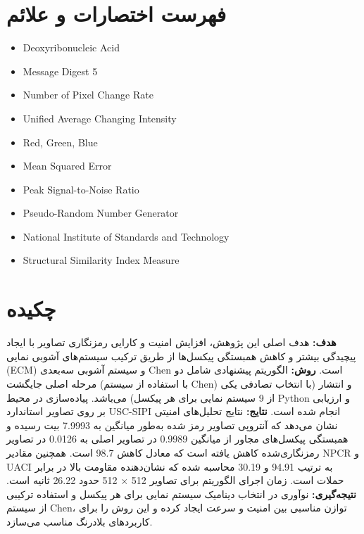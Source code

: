 \documentclass[a4paper,12pt]{report}
\renewcommand{\%}{\lr{\oldpercent}}
\providecommand{\lr}[1]{#1}
\begin{document}
\chapter*{فهرست اختصارات و علائم}
\begin{latin}
\begin{itemize}
    \item[DNA] Deoxyribonucleic Acid
    \item[MD5] Message Digest 5
    \item[NPCR] Number of Pixel Change Rate
    \item[UACI] Unified Average Changing Intensity
    \item[RGB] Red, Green, Blue
    \item[MSE] Mean Squared Error
    \item[PSNR] Peak Signal-to-Noise Ratio
    \item[PRNG] Pseudo-Random Number Generator
    \item[NIST] National Institute of Standards and Technology
    \item[SSIM] Structural Similarity Index Measure
\end{itemize}
\end{latin}
\newpage
\clearpage

\setcounter{page}{1}

\chapter*{چکیده}

\textbf{هدف:} هدف اصلی این پژوهش، افزایش امنیت و کارایی رمزنگاری تصاویر با ایجاد پیچیدگی بیشتر و کاهش همبستگی پیکسل‌ها از طریق ترکیب سیستم‌های آشوبی نمایی (\lr{ECM}) و سیستم آشوبی سه‌بعدی \lr{Chen} است. 
\textbf{روش:} الگوریتم پیشنهادی شامل دو مرحله اصلی جایگشت (با استفاده از سیستم \lr{Chen}) و انتشار (با انتخاب تصادفی یکی از 9 سیستم نمایی برای هر پیکسل) می‌باشد. پیاده‌سازی در محیط \lr{Python} و ارزیابی بر روی تصاویر استاندارد \lr{USC-SIPI} انجام شده است. 
\textbf{نتایج:} نتایج تحلیل‌های امنیتی نشان می‌دهد که آنتروپی تصاویر رمز شده به‌طور میانگین به 7.9993 بیت رسیده و همبستگی پیکسل‌های مجاور از میانگین 0.9989 در تصاویر اصلی به 0.0126 در تصاویر رمزنگاری‌شده کاهش یافته است که معادل کاهش \lr{98.7\%} است. همچنین مقادیر \lr{NPCR} و \lr{UACI} به ترتیب \lr{94.91\%} و \lr{30.19\%} محاسبه شده که نشان‌دهنده مقاومت بالا در برابر حملات است. زمان اجرای الگوریتم برای تصاویر 512 × 512 حدود 26.22 ثانیه است. 
\textbf{نتیجه‌گیری:} نوآوری در انتخاب دینامیک سیستم نمایی برای هر پیکسل و استفاده ترکیبی از سیستم \lr{Chen}، توازن مناسبی بین امنیت و سرعت ایجاد کرده و این روش را برای کاربردهای بلادرنگ مناسب می‌سازد.
    
\end{document}
